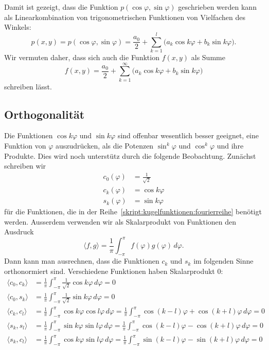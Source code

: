 Damit ist gezeigt, dass die Funktion $p(\cos\varphi,\sin\varphi)$
geschrieben werden kann als Linearkombination von trigonometrischen
Funktionen von Vielfachen des Winkels:
\[
p(x,y)=p(\cos\varphi,\sin\varphi)
=
\frac{a_0}2
+
\sum_{k=1}^l \bigl(
a_k\cos k\varphi+b_k\sin k\varphi
\bigr).
\]
Wir vermuten daher, dass sich auch die Funktion $f(x,y)$ als Summe
\begin{equation}
f(x,y)
=
\frac{a_0}2
+
\sum_{k=1}^\infty \bigl(
a_k\cos k\varphi+b_k\sin k\varphi
\bigr)
\label{skript:kugelfunktionen:fourierreihe}
\end{equation}
schreiben lässt.

\subsection{Orthogonalität}
Die Funktionen $\cos k\varphi$ und $\sin k\varphi$ sind offenbar 
wesentlich besser geeignet, eine Funktion von $\varphi$ auszudrücken,
als die Potenzen $\sin^k\varphi$ und $\cos^k\varphi$ und ihre Produkte.
Dies wird noch unterstütz durch die folgende Beobachtung.
Zunächst schreiben wir
\begin{align*}
c_0(\varphi)&=\frac{1}{\sqrt{2}}
\\
c_k(\varphi)&=\cos k\varphi
\\
s_k(\varphi)&=\sin k\varphi
\end{align*}
für die Funktionen, die in der
Reihe~\eqref{skript:kugelfunktionen:fourierreihe}
benötigt werden.
Ausserdem verwenden wir als Skalarprodukt von Funktionen
den Ausdruck
\begin{equation}
\langle f,g\rangle
=
\frac1{\pi}
\int_{-\pi}^{\pi}
f(\varphi)g(\varphi)
\,d\varphi.
\end{equation}
Dann kann man ausrechnen, dass die Funktionen $c_k$ und $s_k$ im
folgenden Sinne orthonormiert sind.
Verschiedene Funktionen haben Skalarprodukt $0$:
\begin{align*}
\langle c_0,c_k\rangle
&=
\frac{1}{\pi}\int_{-\pi}^\pi \frac{1}{\sqrt{2}}\cos k\varphi\,d\varphi=0
\\
\langle c_0,s_k\rangle
&=
\frac{1}{\pi}\int_{-\pi}^\pi \frac{1}{\sqrt{2}}\sin k\varphi\,d\varphi=0
\\
\langle c_k,c_l\rangle
&=
\frac1{\pi}
\int_{-\pi}^{\pi}
\cos k\varphi\cos l\varphi
\,d\varphi
=
\frac1{\pi}
\int_{-\pi}^{\pi}
\cos(k-l)\varphi + \cos(k+l)\varphi
\,d\varphi
=0
\\
\langle s_k,s_l\rangle
&=
\frac1{\pi}
\int_{-\pi}^{\pi}
\sin k\varphi\sin l\varphi
\,d\varphi
=
\frac1{\pi}
\int_{-\pi}^{\pi}
\cos(k-l)\varphi - \cos(k+l)\varphi
\,d\varphi
=0
\\
\langle s_k,c_l\rangle
&=
\frac1{\pi}
\int_{-\pi}^{\pi}
\cos k\varphi\sin l\varphi
\,d\varphi
=
\frac1{\pi}
\int_{-\pi}^{\pi}
\sin(k-l)\varphi - \sin(k+l)\varphi
\,d\varphi
=0
\end{align*}
